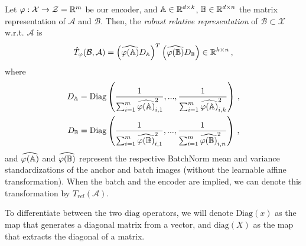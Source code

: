 \documentclass[../main.tex]{subfiles}
\begin{document}
\begin{definition}
Let $\varphi:\mathcal{X} \to \mathcal{Z}=\mathbb{R}^m$ be our encoder, and $\mathbb{A}\in \mathbb{R}^{d \times k}$, $\mathbb{B}\in \mathbb{R}^{d \times n}$ the matrix representation of $\mathcal{A}$ and $\mathcal{B}$. Then, the \emph{robust relative representation} of $\mathcal{B} \subset \mathcal{X}$ w.r.t. $\mathcal{A}$ is
\[
\hat{T}_\varphi(\mathcal{B}, \mathcal{A}) = \left(\widehat{\varphi(\mathbb{A})} D_{\mathbb{A}}\right)^T \left(\widehat{\varphi(\mathbb{B})} D_{\mathbb{B}}\right) \in \mathbb{R}^{k \times n}\,,
\]
where
\begin{gather*}
D_{\mathbb{A}} = \text{Diag}\left( \frac{1}{\sum_{i=1}^{m} \widehat{\varphi(\mathbb{A})}^2_{i,1}}, ...,       \frac{1}{\sum_{i=1}^{m} \widehat{\varphi(\mathbb{A})}^2_{i,k}} \right)\,,\\
D_{\mathbb{B}} = \text{Diag}\left( \frac{1}{\sum_{i=1}^{m} \widehat{\varphi(\mathbb{B})}^2_{i,1}}, ...,       \frac{1}{\sum_{i=1}^{m} \widehat{\varphi(\mathbb{B})}^2_{i,n}} \right)\,,
\end{gather*}
and $\widehat{\varphi(\mathbb{A})}$ and $\widehat{\varphi(\mathbb{B})}$ represent the respective BatchNorm mean and variance standardizations of the anchor and batch images (without the learnable affine transformation). When the batch and the encoder are implied, we can denote this transformation by $\hat{T}_{rel}(\mathcal{A})$.
\end{definition}

\begin{mathNote}
To differentiate between the two $\text{diag}$ operators, we will denote $\text{Diag}(x)$ as the map that generates a diagonal matrix from a vector, and $\text{diag}(X)$ as the map that extracts the diagonal of a matrix.
\end{mathNote}
\end{document}
